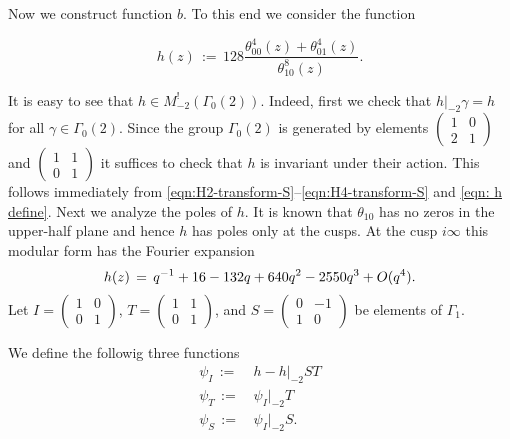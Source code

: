 Now we construct function $b$. To this end we consider the function
\begin{definition}\label{def: h}
\begin{equation}\label{eqn: h define}
  h(z)\,:=\,128 \frac{\theta_{00}^4(z)+\theta_{01}^4(z)}{\theta_{10}^8(z)}.
\end{equation}
\end{definition}
It is easy to see that $h\in M^!_{-2}(\Gamma_0(2))$. Indeed, first we check that $h|_{-2}\gamma=h$
for all $\gamma\in\Gamma_0(2)$. Since the group $\Gamma_0(2)$ is generated by elements
$\left(\begin{smallmatrix}1&0\\2&1\end{smallmatrix}\right)$ and $\left(\begin{smallmatrix}1&1\\0&1\end{smallmatrix}\right)$
it suffices to check that $h$ is invariant under their action. This follows immediately
from \eqref{eqn:H2-transform-S}--\eqref{eqn:H4-transform-S} and \eqref{eqn: h define}. Next we analyze the poles of $h$.
It is known \cite[Chapter~I Lemma~4.1]{Mumford} that $\theta_{10}$ has no zeros in the upper-half plane and hence $h$ has poles only at the cusps.
At the cusp $i\infty$ this modular form has the Fourier expansion
\begin{equation}
h(z)\,=\,q^{-1} + 16 - 132 q + 640 q^2 - 2550 q^3+O(q^4).\notag
\end{equation}
Let $I=\left(\begin{smallmatrix}1&0\\0&1\end{smallmatrix}\right)$,
$T=\left(\begin{smallmatrix}1&1\\0&1\end{smallmatrix}\right)$, and
$S=\left(\begin{smallmatrix}0&-1\\1&0\end{smallmatrix}\right)$ be elements of $\Gamma_1$.
\begin{definition}\label{def: psi I psi T psi S}
We define the followig three functions
\begin{align}
  \psi_I\,:=\,&h-h|_{-2}ST \label{eqn: psi I define}\\
  \psi_T\,:=\,&\psi_I|_{-2}T \label{eqn: psi T define}\\
  \psi_S\,:=\,&\psi_I|_{-2}S. \label{eqn: psi S define}
\end{align}
\end{definition}
